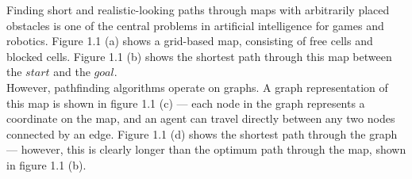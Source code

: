 \documentclass[12pt,notitlepage]{report}
\begin{document}
Finding short and realistic-looking paths through maps with arbitrarily placed obstacles is one of the central problems in artificial intelligence for games and robotics. Figure 1.1 (a) shows a grid-based map, consisting of free cells and blocked cells. Figure 1.1 (b) shows the shortest path through this map between the $start$ and the $goal$.\\

\noindent
However, pathfinding algorithms operate on graphs. A graph representation of this map is shown in figure 1.1 (c) --- each node in the graph represents a coordinate on the map, and an agent can travel directly between any two nodes connected by an edge. Figure 1.1 (d) shows the shortest path through the graph --- however, this is clearly longer than the optimum path through the map, shown in figure 1.1 (b).\\
\end{document}
